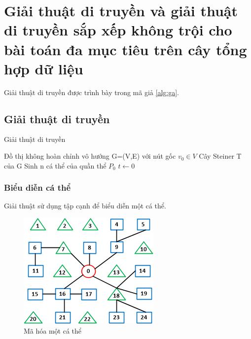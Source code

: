 \documentclass{hust}
\begin{document}
\chapter{Giải thuật di truyền và giải thuật di truyền sắp xếp không trội cho bài toán đa mục tiêu trên cây tổng hợp dữ liệu}
Giải thuật di truyền được trình bày trong mã giả \ref{alg:ga}.

\section{Giải thuật di truyền}
\begin{algorithm}[H]
	\caption{Giải thuật di truyền}\label{alg:ga}
	\begin{algorithmic}[1]
		\Require Đồ thị không hoàn chỉnh vô hướng G=(V,E) với nút gốc $v_0 \in V$
		\Ensure Cây Steiner T của G
		\State Sinh n cá thể của quần thể $P_0$
		\EndFor
		\State $t\leftarrow 0$
		\EndWhile
	\end{algorithmic}
\end{algorithm}

\subsection{Biểu diễn cá thể}
Giải thuật sử dụng tập cạnh để biểu diễn một cá thể.

\begin{figure}[H]
	\centering
	\includegraphics[scale=1.0]{images/graph}
	\caption{Mã hóa một cá thể}\label{fig:encode}
\end{figure}
\end{document}
